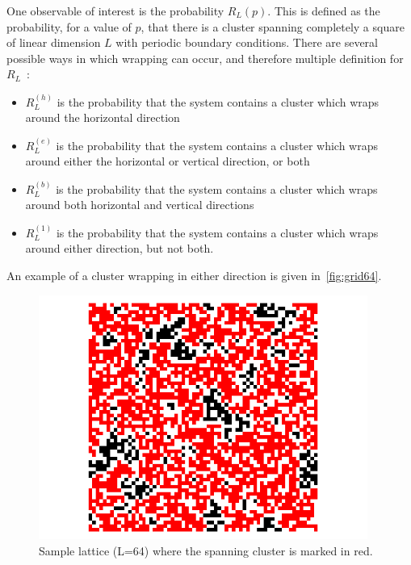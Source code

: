 One observable of interest is the probability $R_L(p)$. This is defined as the probability, for a value of $p$, that there is a cluster spanning completely a square of linear dimension $L$ with periodic boundary conditions. There are several possible ways in which wrapping can occur, and therefore multiple definition for $R_L$~\cite{Newman_2001}:
\begin{itemize}
	\item $R_L^{(h)}$ is the probability that the system contains a cluster which wraps around the horizontal direction
	\item $R_L^{(e)}$ is the probability that the system contains a cluster which wraps around either the horizontal or vertical direction, or both
	\item $R_L^{(b)}$ is the probability that the system contains a cluster which wraps around both horizontal and vertical directions
	\item $R_L^{(1)}$ is the probability that the system contains a cluster which wraps around either direction, but not both.
\end{itemize}
An example of a cluster wrapping in either direction is given in~\autoref{fig:grid64}.

\begin{figure}
	\centering
		\includegraphics[height=80mm]{../plots/sample64}
		\caption{\label{fig:grid64} Sample lattice (L=64) where the spanning cluster is marked in red.}
\end{figure}

